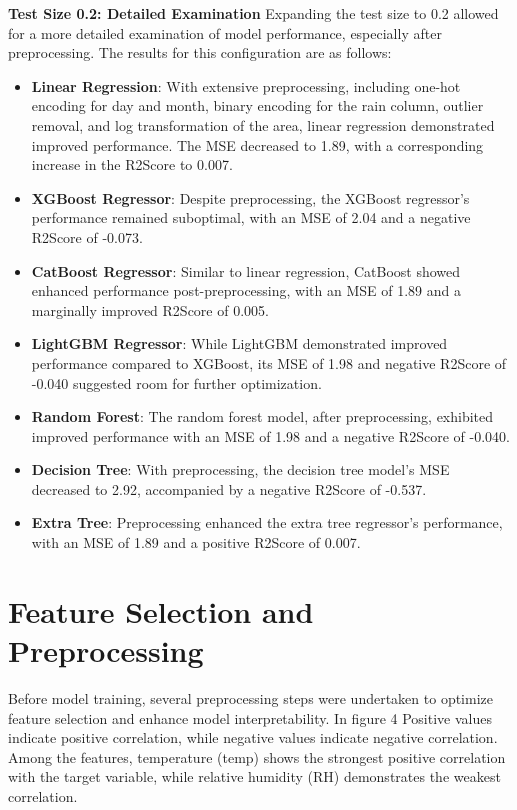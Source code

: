 \textbf{Test Size 0.2: Detailed Examination}
Expanding the test size to 0.2 allowed for a more detailed examination of model performance, especially after preprocessing. The results for this configuration are as follows:
\begin{itemize}
\item \textbf{Linear Regression}: With extensive preprocessing, including one-hot encoding for day and month, binary encoding for the rain column, outlier removal, and log transformation of the area, linear regression demonstrated improved performance. The MSE decreased to 1.89, with a corresponding increase in the R2Score to 0.007.

\item \textbf{XGBoost Regressor}: Despite preprocessing, the XGBoost regressor's performance remained suboptimal, with an MSE of 2.04 and a negative R2Score of -0.073.

\item \textbf{CatBoost Regressor}: Similar to linear regression, CatBoost showed enhanced performance post-preprocessing, with an MSE of 1.89 and a marginally improved R2Score of 0.005.

\item \textbf{LightGBM Regressor}: While LightGBM demonstrated improved performance compared to XGBoost, its MSE of 1.98 and negative R2Score of -0.040 suggested room for further optimization.

\item \textbf{Random Forest}: The random forest model, after preprocessing, exhibited improved performance with an MSE of 1.98 and a negative R2Score of -0.040.

\item \textbf{Decision Tree}: With preprocessing, the decision tree model's MSE decreased to 2.92, accompanied by a negative R2Score of -0.537.

\item \textbf{Extra Tree}: Preprocessing enhanced the extra tree regressor's performance, with an MSE of 1.89 and a positive R2Score of 0.007.
\end{itemize} 

\clearpage
\section{Feature Selection and Preprocessing}
Before model training, several preprocessing steps were undertaken to optimize feature selection and enhance model interpretability. In figure 4 Positive values indicate positive correlation, while negative values indicate negative correlation. Among the features, temperature (temp) shows the strongest positive correlation with the target variable, while relative humidity (RH) demonstrates the weakest correlation.

